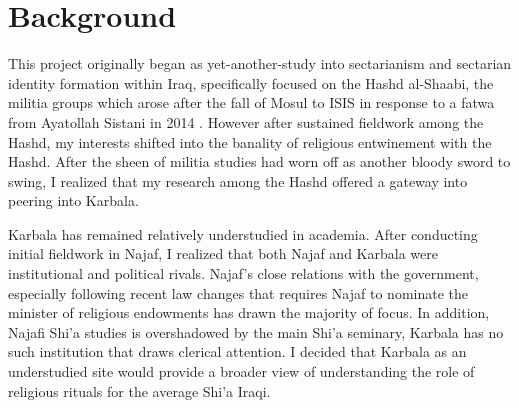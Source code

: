 

\section{Background}
This project originally began as yet-another-study into sectarianism and sectarian identity formation within Iraq, specifically focused on the Hashd al-Shaabi, the militia groups which arose after the fall of Mosul to ISIS in response to a fatwa from Ayatollah Sistani in 2014 \cite{jonathan_stevenson_shia_2017}. However after sustained fieldwork among the Hashd, my interests shifted into the banality of religious entwinement with the Hashd. After the sheen of militia studies had worn off as another bloody sword to swing, I realized that my research among the Hashd offered a gateway into peering into Karbala. 


Karbala has remained relatively understudied in academia. After conducting initial fieldwork in Najaf, I realized that both Najaf and Karbala were institutional and political rivals. Najaf's close relations with the government, especially following recent law changes that requires Najaf to nominate the minister of religious endowments \cite{hamoudi_engagements_2020} has drawn the majority of focus. In addition, Najafi Shi'a studies is overshadowed by the main Shi'a seminary, Karbala has no such institution that draws clerical attention. I decided that Karbala as an understudied site would provide a broader view of understanding the role of religious rituals for the average Shi'a Iraqi. 


